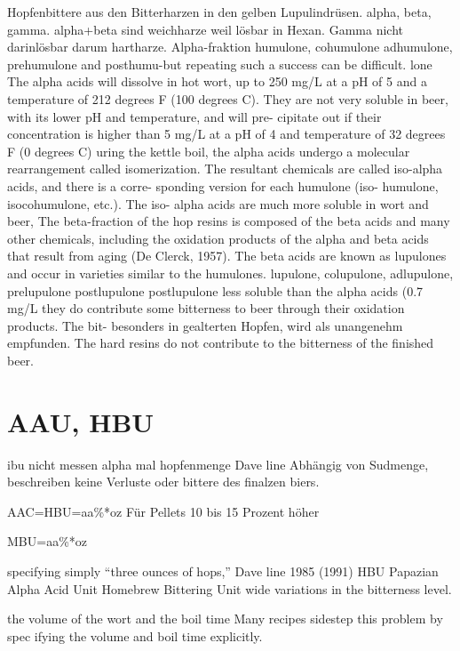 \documentclass[a4paper,parskip=half]{scrartcl}
\begin{document}
\parencite[55]{Hall1997}
Hopfenbittere aus den Bitterharzen in den gelben Lupulindrüsen.
alpha, beta, gamma. alpha+beta sind weichharze weil
lösbar in Hexan. Gamma nicht darinlösbar darum
hartharze. Alpha-fraktion humulone, cohumulone
adhumulone, prehumulone and posthumu-but repeating such a success can be difficult.
lone
The alpha acids will dissolve
in hot wort, up to 250 mg/L at a pH of 5 and
a temperature of 212 degrees F (100 degrees
C). They are not very soluble in beer, with
its lower pH and temperature, and will pre-
cipitate out if their concentration is higher
than 5 mg/L at a pH of 4 and temperature of
32 degrees F (0 degrees C)
uring the kettle boil, the alpha acids
undergo a molecular rearrangement called
isomerization. The resultant chemicals are
called iso-alpha acids, and there is a corre-
sponding version for each humulone (iso-
humulone, isocohumulone, etc.). The iso-
alpha acids are much more soluble in wort
and beer,
The beta-fraction of the hop resins is
composed of the beta acids and many other
chemicals, including the oxidation products
of the alpha and beta acids that result from
aging (De Clerck, 1957). The beta acids are
known as lupulones and occur in varieties
similar to the humulones.
lupulone,
colupulone, adlupulone, prelupulone
postlupulone
postlupulone
less soluble than the alpha acids (0.7 mg/L
they do contribute some bitterness to beer
through their oxidation products. The bit-
besonders in gealterten Hopfen, wird
als unangenehm empfunden.
The hard resins do not contribute to the
bitterness of the finished beer.



\section*{AAU, HBU}

\parencite[122\psq]{Garetz1994} 
ibu nicht messen
alpha mal hopfenmenge
Dave line
Abhängig von Sudmenge, beschreiben keine Verluste oder bittere
des finalzen biers.

\parencite[40]{Favre1990}
AAC=HBU=aa\%*oz
Für Pellets 10 bis 15 Prozent höher

\parencite[60]{Papazian2003}
MBU=aa\%*oz

\parencite[55\psq]{Hall1997}
specifying simply “three ounces of hops,”
Dave line 1985
(1991) HBU Papazian
Alpha Acid Unit
Homebrew Bittering Unit
wide variations in the bitterness level.

the volume of the wort and the boil time
Many recipes sidestep this problem by spec
ifying the volume and boil time explicitly.
\end{document}
